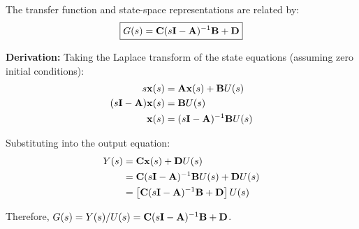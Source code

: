 The transfer function and state-space representations are related by:
\begin{equation}
\boxed{
    G(s) = \mathbf{C}(s\mathbf{I} - \mathbf{A})^{-1}\mathbf{B} + \mathbf{D}
}
\label{eq:tf_ss_relation}
\end{equation}

\textbf{Derivation:} Taking the Laplace transform of the state equations (assuming zero initial conditions):
\begin{align}
    s\mathbf{x}(s) &= \mathbf{A}\mathbf{x}(s) + \mathbf{B}U(s) \\
    (s\mathbf{I} - \mathbf{A})\mathbf{x}(s) &= \mathbf{B}U(s) \\
    \mathbf{x}(s) &= (s\mathbf{I} - \mathbf{A})^{-1}\mathbf{B}U(s)
\end{align}

Substituting into the output equation:
\begin{align}
    Y(s) &= \mathbf{C}\mathbf{x}(s) + \mathbf{D}U(s) \\
         &= \mathbf{C}(s\mathbf{I} - \mathbf{A})^{-1}\mathbf{B}U(s) + \mathbf{D}U(s) \\
         &= \left[\mathbf{C}(s\mathbf{I} - \mathbf{A})^{-1}\mathbf{B} + \mathbf{D}\right]U(s)
\end{align}

Therefore, $G(s) = Y(s)/U(s) = \mathbf{C}(s\mathbf{I} - \mathbf{A})^{-1}\mathbf{B} + \mathbf{D}$.


